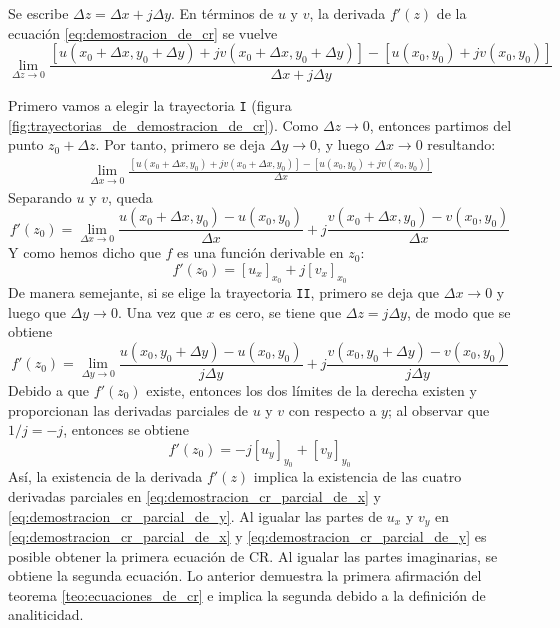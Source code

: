 Se escribe $\Delta z = \Delta x + j \Delta y$. En términos de $u$ y $v$, la derivada $f'(z)$ de la ecuación \ref{eq:demostracion_de_cr} se vuelve
\begin{equation*}
  \lim_{\Delta z \to 0} 
    \frac
      {\left[ 
        u(x_0+\Delta x, y_0+\Delta y) + jv(x_0+\Delta x, y_0 +\Delta y) 
      \right] - \left[
        u(x_0,y_0) + jv(x_0,y_0)
      \right]}
      {\Delta x + j\Delta y}
\end{equation*}

Primero vamos a elegir la trayectoria \texttt{I} (figura \ref{fig:trayectorias_de_demostracion_de_cr}). Como $\Delta z \to 0$, entonces partimos del punto $z_0+\Delta z$. Por tanto, primero se deja $\Delta y \to 0$, y luego $\Delta x \to 0$ resultando:
\begin{align*}
  \lim_{\Delta x \to 0}\frac{[u(x_0+\Delta x,y_0)+jv(x_0+\Delta x, y_0)]-[u(x_0,y_0)+jv(x_0,y_0)]}{\Delta x}
\end{align*}
Separando $u$ y $v$, queda
\begin{equation*}
  f'(z_0)=\lim_{\Delta x \to 0} \frac{u(x_0+\Delta x,y_0)-u(x_0,y_0)}{\Delta x} + j\frac{v(x_0+\Delta x,y_0)-v(x_0,y_0)}{\Delta x}
\end{equation*}
Y como hemos dicho que $f$ es una función derivable en $z_0$:
\begin{equation}\label{eq:demostracion_cr_parcial_de_x}
  \boxed{f'(z_0)=[u_x]_{x_0} + j[v_x]_{x_0}}
\end{equation}
De manera semejante, si se elige la trayectoria \texttt{II}, primero se deja que $\Delta x \to 0$ y luego que $\Delta y \to 0$. Una vez que $x$ es cero, se tiene que $\Delta z = j\Delta y$, de modo que se obtiene
\begin{equation*}
  f'(z_0) = \lim_{\Delta y \to 0}\frac{u(x_0,y_0+\Delta y)-u(x_0,y_0)}{j\Delta y} + j\frac{v(x_0,y_0+\Delta y)-v(x_0,y_0)}{j\Delta y}
\end{equation*}
Debido a que $f'(z_0)$ existe, entonces los dos límites de la derecha existen y proporcionan las derivadas parciales de $u$ y $v$ con respecto a $y$; al observar que $1/j=-j$, entonces se obtiene
\begin{equation}\label{eq:demostracion_cr_parcial_de_y}
  \boxed{f'(z_0) = -j[u_y]_{y_0} + [v_y]_{y_0}}
\end{equation}
Así, la existencia de la derivada $f'(z)$ implica la existencia de las cuatro derivadas parciales en \ref{eq:demostracion_cr_parcial_de_x} y \ref{eq:demostracion_cr_parcial_de_y}. Al igualar las partes de $u_x$ y $v_y$ en \ref{eq:demostracion_cr_parcial_de_x} y \ref{eq:demostracion_cr_parcial_de_y} es posible obtener la primera ecuación de CR. Al igualar las partes imaginarias, se obtiene la segunda ecuación. Lo anterior demuestra la primera afirmación del teorema \ref{teo:ecuaciones_de_cr} e implica la segunda debido a la definición de analiticidad.

